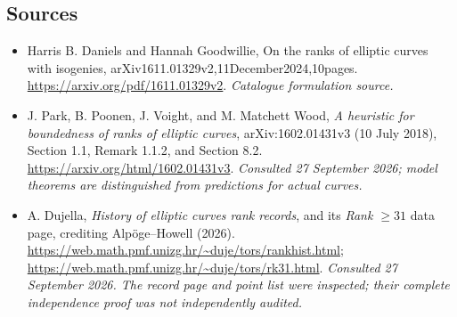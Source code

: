 \documentclass[11pt,a4paper]{article}
\numberwithin{equation}{section}
\begin{document}
\subsection{Sources}
\begin{itemize}\raggedright
\item[\textnormal{[S1]}]\hypertarget{source:107:1}{} Harris B. Daniels and Hannah Goodwillie, On the ranks of elliptic curves with isogenies, arXiv1611.01329v2,11December2024,10pages.
\url{https://arxiv.org/pdf/1611.01329v2}.
{\small\textit{Catalogue formulation source.}}
\item[\textnormal{[E1]}]\hypertarget{extra:107:1}{} J. Park, B. Poonen,
J. Voight, and M. Matchett Wood, \emph{A heuristic for boundedness of ranks
of elliptic curves}, arXiv:1602.01431v3 (10 July 2018),
Section 1.1, Remark 1.1.2, and Section 8.2.
\url{https://arxiv.org/html/1602.01431v3}.
{\small\textit{Consulted 27 September 2026; model theorems are distinguished from predictions for actual curves.}}
\item[\textnormal{[E2]}]\hypertarget{extra:107:2}{} A. Dujella,
\emph{History of elliptic curves rank records}, and its
\emph{Rank $\geq31$} data page, crediting Alp\"oge--Howell (2026).
\url{https://web.math.pmf.unizg.hr/~duje/tors/rankhist.html};
\url{https://web.math.pmf.unizg.hr/~duje/tors/rk31.html}.
{\small\textit{Consulted 27 September 2026. The record page and point list were inspected; their complete independence proof was not independently audited.}}
\end{itemize}
\end{document}
